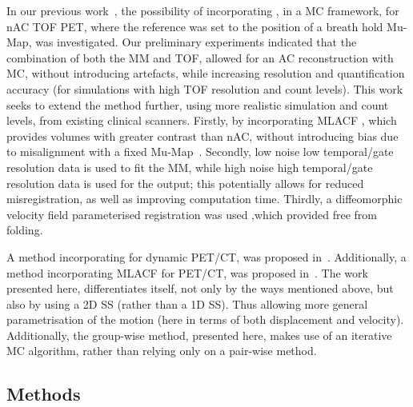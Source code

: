             In our previous work~\parencite{Whitehead2019ImpactPET, Whitehead2020PET/CTFields, Whitehead2021ComparisonMap}, the possibility of incorporating , in a \gls{MC} framework, for \gls{nAC} \gls{TOF} \gls{PET}, where the reference was set to the position of a breath hold \gls{Mu-Map}, was investigated. %
            Our preliminary experiments indicated that the combination of both the \gls{MM} and \gls{TOF}, allowed for an \gls{AC} reconstruction with \gls{MC}, without introducing artefacts, while increasing resolution and quantification accuracy (for simulations with high \gls{TOF} resolution and count levels). This work seeks to extend the method further, using more realistic simulation and count levels, from existing clinical scanners. Firstly, by incorporating \gls{MLACF} %
            , which provides volumes with greater contrast than \gls{nAC}, without introducing bias due to misalignment with a fixed \gls{Mu-Map}~\parencite{Nuyts2012ML-reconstructionFactors}. Secondly, low noise low temporal/gate resolution data is used to fit the \gls{MM}, while high noise high temporal/gate resolution data is used for the output; this potentially allows for reduced misregistration, as well as improving computation time. Thirdly, a diffeomorphic velocity field parameterised registration was used ,which provided  free from folding.
            
            A method incorporating  for dynamic \gls{PET}/\gls{CT}, was proposed in~\parencite{Chan2018Non-RigidPET}. Additionally, a method incorporating \gls{MLACF} for \gls{PET}/\gls{CT}, was proposed in~\parencite{Lu2018RespiratoryData}. The work presented here, differentiates itself, not only by the ways mentioned above, but also by using a \gls{2D} \gls{SS} (rather than a \gls{1D} \gls{SS}). Thus allowing more general parametrisation of the motion (here in terms of both displacement and velocity). Additionally, the group-wise method, presented here, makes use of an iterative \gls{MC} algorithm, rather than relying only on a pair-wise method.
        
        
        \subsection{Methods} \label{sec:pet_ct_motion_correction_exploiting_motion_models_fit_on_coarsely_gated_data_applied_to_finely_gated_data_methods}
